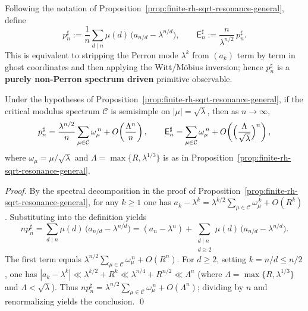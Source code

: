 \begin{definition}\label{def:primitive-sharp}
Following the notation of Proposition~\ref{prop:finite-rh-sqrt-resonance-general}, define
\[
p_n^\sharp
:=\frac{1}{n}\sum_{d\mid n}\mu(d)\,\bigl(a_{n/d}-\lambda^{n/d}\bigr),
\qquad
\mathsf{E}_n^\sharp
:=\frac{n}{\lambda^{n/2}}\,p_n^\sharp.
\]
This is equivalent to stripping the Perron mode \(\lambda^k\) from \((a_k)\) term by term in ghost coordinates and then applying the Witt/M\"obius inversion; hence \(p_n^\sharp\) is a \textbf{purely non-Perron spectrum driven} primitive observable.
\end{definition}

\begin{proposition}\label{prop:primitive-sharp-phase-limit}
Under the hypotheses of Proposition~\ref{prop:finite-rh-sqrt-resonance-general}, if the critical modulus spectrum \(\mathcal{C}\) is semisimple on \(|\mu|=\sqrt{\lambda}\), then as \(n\to\infty\),
\[
p_n^\sharp
=\frac{\lambda^{n/2}}{n}\sum_{\mu\in\mathcal{C}}\omega_\mu^{\,n}
+O\!\left(\frac{\Lambda^n}{n}\right),
\qquad
\mathsf{E}_n^\sharp
=\sum_{\mu\in\mathcal{C}}\omega_\mu^{\,n}
+O\!\left(\Bigl(\frac{\Lambda}{\sqrt{\lambda}}\Bigr)^n\right),
\]
where \(\omega_\mu=\mu/\sqrt{\lambda}\) and \(\Lambda=\max\{R,\lambda^{1/3}\}\) is as in Proposition~\ref{prop:finite-rh-sqrt-resonance-general}.
\end{proposition}
\begin{proof}
By the spectral decomposition in the proof of Proposition~\ref{prop:finite-rh-sqrt-resonance-general},
for any \(k\ge 1\) one has
\(
a_k-\lambda^k=\lambda^{k/2}\sum_{\mu\in\mathcal{C}}\omega_\mu^{\,k}+O(R^k)
\).
Substituting into the definition yields
\[
np_n^\sharp=\sum_{d\mid n}\mu(d)\,\bigl(a_{n/d}-\lambda^{n/d}\bigr)
=(a_n-\lambda^n)+\sum_{\substack{d\mid n\\ d\ge 2}}\mu(d)\,\bigl(a_{n/d}-\lambda^{n/d}\bigr).
\]
The first term equals \(\lambda^{n/2}\sum_{\mu\in\mathcal{C}}\omega_\mu^{\,n}+O(R^n)\).
For \(d\ge 2\), setting \(k=n/d\le n/2\), one has
\(
|a_k-\lambda^k|
\ll \lambda^{k/2}+R^k
\ll \lambda^{n/4}+R^{n/2}
\ll \Lambda^n
\)
(where \(\Lambda=\max\{R,\lambda^{1/3}\}\) and \(\Lambda<\sqrt{\lambda}\)).
Thus
\(
np_n^\sharp
=\lambda^{n/2}\sum_{\mu\in\mathcal{C}}\omega_\mu^{\,n}+O(\Lambda^n)
\);
dividing by \(n\) and renormalizing yields the conclusion. \qed
\end{proof}

